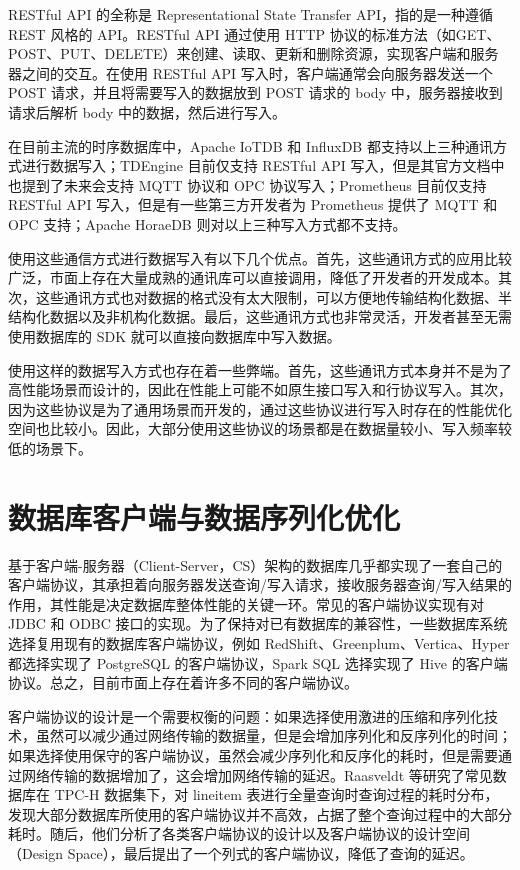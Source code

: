 RESTful API 的全称是 Representational State Transfer API，指的是一种遵循 REST 风格的 API。RESTful API 通过使用 HTTP 协议的标准方法（如GET、POST、PUT、DELETE）来创建、读取、更新和删除资源，实现客户端和服务器之间的交互。在使用 RESTful API 写入时，客户端通常会向服务器发送一个 POST 请求，并且将需要写入的数据放到 POST 请求的 body 中，服务器接收到请求后解析 body 中的数据，然后进行写入。

在目前主流的时序数据库中，Apache IoTDB 和 InfluxDB 都支持以上三种通讯方式进行数据写入；TDEngine 目前仅支持 RESTful API 写入，但是其官方文档中也提到了未来会支持 MQTT 协议和 OPC 协议写入；Prometheus 目前仅支持 RESTful API 写入，但是有一些第三方开发者为 Prometheus 提供了 MQTT 和 OPC 支持；Apache HoraeDB 则对以上三种写入方式都不支持。

使用这些通信方式进行数据写入有以下几个优点。首先，这些通讯方式的应用比较广泛，市面上存在大量成熟的通讯库可以直接调用，降低了开发者的开发成本。其次，这些通讯方式也对数据的格式没有太大限制，可以方便地传输结构化数据、半结构化数据以及非机构化数据。最后，这些通讯方式也非常灵活，开发者甚至无需使用数据库的 SDK 就可以直接向数据库中写入数据。

使用这样的数据写入方式也存在着一些弊端。首先，这些通讯方式本身并不是为了高性能场景而设计的，因此在性能上可能不如原生接口写入和行协议写入。其次，因为这些协议是为了通用场景而开发的，通过这些协议进行写入时存在的性能优化空间也比较小。因此，大部分使用这些协议的场景都是在数据量较小、写入频率较低的场景下。


\section{数据库客户端与数据序列化优化\label{sec:chap2-sec3}}
基于客户端-服务器（Client-Server，CS）架构的数据库几乎都实现了一套自己的客户端协议，其承担着向服务器发送查询/写入请求，接收服务器查询/写入结果的作用，其性能是决定数据库整体性能的关键一环。常见的客户端协议实现有对 JDBC\cite{zukowski2006jdbc} 和 ODBC\cite{geiger1995inside} 接口的实现。为了保持对已有数据库的兼容性，一些数据库系统选择复用现有的数据库客户端协议，例如 RedShift\cite{gupta2015amazon}、Greenplum\cite{lyu2021greenplum}、Vertica\cite{lamb2012vertica}、Hyper\cite{neumann2011efficiently} 都选择实现了 PostgreSQL 的客户端协议，Spark SQL\cite{armbrust2015spark} 选择实现了 Hive 的客户端协议。总之，目前市面上存在着许多不同的客户端协议。

客户端协议的设计是一个需要权衡的问题：如果选择使用激进的压缩和序列化技术，虽然可以减少通过网络传输的数据量，但是会增加序列化和反序列化的时间；如果选择使用保守的客户端协议，虽然会减少序列化和反序化的耗时，但是需要通过网络传输的数据增加了，这会增加网络传输的延迟。Raasveldt 等研究了常见数据库在 TPC-H 数据集\cite{poess2000new}下，对 lineitem 表进行全量查询时查询过程的耗时分布，发现大部分数据库所使用的客户端协议并不高效，占据了整个查询过程中的大部分耗时。随后，他们分析了各类客户端协议的设计以及客户端协议的设计空间（Design Space），最后提出了一个列式的客户端协议，降低了查询的延迟\cite{raasveldt2017don}。

